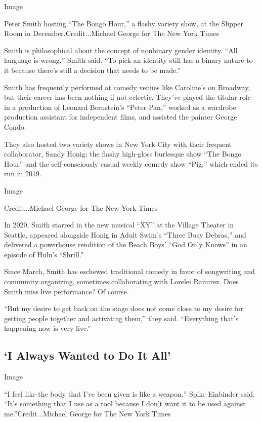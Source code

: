 Image

Peter Smith hosting ``The Bongo Hour,'' a flashy variety show, at the
Slipper Room in December.Credit...Michael George for The New York Times

Smith is philosophical about the concept of nonbinary gender identity.
``All language is wrong,'' Smith said. ``To pick an identity still has a
binary nature to it because there's still a decision that needs to be
made.''

Smith has frequently performed at comedy venues like Caroline's on
Broadway, but their career has been nothing if not eclectic. They've
played the titular role in a production of Leonard Bernstein's ``Peter
Pan,'' worked as a wardrobe production assistant for independent films,
and assisted the painter George Condo.

They also hosted two variety shows in New York City with their frequent
collaborator, Sandy Honig: the flashy high-gloss burlesque show ``The
Bongo Hour'' and the self-consciously casual weekly comedy show ``Pig,''
which ended its run in 2019.

Image

Credit...Michael George for The New York Times

In 2020, Smith starred in the new musical ``XY'' at the Village Theater
in Seattle, appeared alongside Honig in Adult Swim's ``Three Busy
Debras,'' and delivered a powerhouse rendition of the Beach Boys' ``God
Only Knows'' in an episode of Hulu's ``Shrill.''

Since March, Smith has eschewed traditional comedy in favor of
songwriting and community organizing, sometimes collaborating with
Lorelei Ramirez. Does Smith miss live performance? Of course.

``But my desire to get back on the stage does not come close to my
desire for getting people together and activating them,'' they said.
``Everything that's happening now is very live.''

\hypertarget{i-always-wanted-to-do-it-all}{%
\subsection{`I Always Wanted to Do It
All'}\label{i-always-wanted-to-do-it-all}}

Image

``I feel like the body that I've been given is like a weapon,'' Spike
Einbinder said. ``It's something that I use as a tool because I don't
want it to be used against me.''Credit...Michael George for The New York
Times

